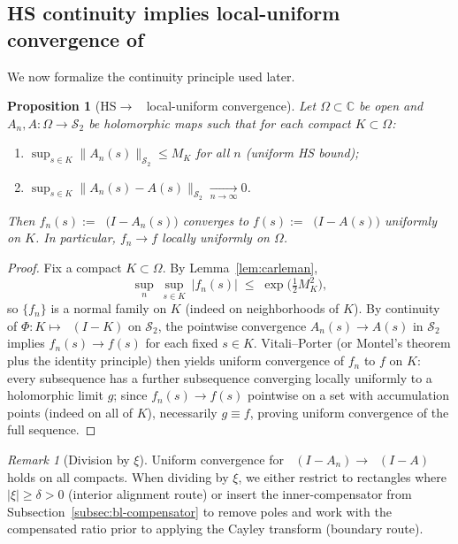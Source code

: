 \documentclass[11pt]{article}
\newtheorem{proposition}[theorem]{Proposition}
\theoremstyle{remark}
\newtheorem{remark}[theorem]{Remark}
\newcommand{\C}{\mathbb{C}}
\newcommand{\HS}{\mathcal{S}_2}
\DeclareMathOperator{\dettwo}{det_2}
\begin{document}
\subsection{HS continuity implies local-uniform convergence of \(\dettwo\)}
We now formalize the continuity principle used later.

\begin{proposition}[HS\(\to\)\(\dettwo\) local-uniform convergence]\label{prop:HS-to-det2}
Let \(\Omega\subset\C\) be open and \(A_n,A:\Omega\to\HS\) be holomorphic maps such that for each compact \(K\subset\Omega\):
\begin{enumerate}
 \item \(\sup_{s\in K}\|A_n(s)\|_{\HS}\le M_K\) for all \(n\) (uniform HS bound);
 \item \(\sup_{s\in K}\|A_n(s)-A(s)\|_{\HS}\xrightarrow[n\to\infty]{}0\).
\end{enumerate}
Then \(f_n(s):=\dettwo\big(I-A_n(s)\big)\) converges to \(f(s):=\dettwo\big(I-A(s)\big)\) uniformly on \(K\). In particular, \(f_n\to f\) locally uniformly on \(\Omega\).
\end{proposition}
\begin{proof}
Fix a compact \(K\subset\Omega\). By Lemma~\ref{lem:carleman},
\[
 \sup_{n}\ \sup_{s\in K}\ |f_n(s)|\;\le\; \exp\!\Big(\tfrac12 M_K^2\Big),
\]
so \(\{f_n\}\) is a normal family on \(K\) (indeed on neighborhoods of \(K\)). By continuity of \(\Phi:K\mapsto\dettwo(I-K)\) on \(\HS\), the pointwise convergence \(A_n(s)\to A(s)\) in \(\HS\) implies \(f_n(s)\to f(s)\) for each fixed \(s\in K\). Vitali--Porter (or Montel's theorem plus the identity principle) then yields uniform convergence of \(f_n\) to \(f\) on \(K\): every subsequence has a further subsequence converging locally uniformly to a holomorphic limit \(g\); since \(f_n(s)\to f(s)\) pointwise on a set with accumulation points (indeed on all of \(K\)), necessarily \(g\equiv f\), proving uniform convergence of the full sequence.
\end{proof}

\begin{remark}[Division by \(\xi\)]
Uniform convergence for \(\dettwo(I-A_n)\to\dettwo(I-A)\) holds on all compacts. When dividing by \(\xi\), we either restrict to rectangles where \(|\xi|\ge \delta>0\) (interior alignment route) or insert the inner-compensator from Subsection~\ref{subsec:bl-compensator} to remove poles and work with the compensated ratio prior to applying the Cayley transform (boundary route).
\end{remark}
\end{document}

